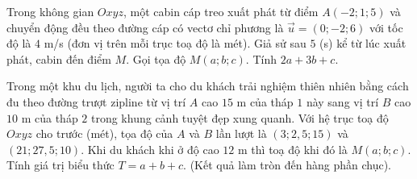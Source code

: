 \begin{bt}%
	Trong không gian $Oxyz$, một cabin cáp treo xuất phát từ điểm $A(-2;1;5)$ và chuyển động đều theo đường cáp có vectơ chỉ phương là $\overrightarrow{u}=(0;-2;6)$ với tốc độ là $4$ m/s (đơn vị trên mỗi trục toạ độ là mét). Giả sử sau $5$ (s) kể từ lúc xuất phát, cabin đến  điểm $M$. Gọi tọa độ $M(a;b;c)$. Tính $2a+3b+c$.
\end{bt}

\begin{bt}%
	Trong một khu du lịch, người ta cho du khách trải nghiệm thiên nhiên bằng cách đu theo đường trượt zipline từ vị trí $A$ cao $15$ m của tháp $1$ này sang vị trí $B$ cao $10$ m của tháp $2$ trong khung cảnh tuyệt đẹp xung quanh. Với  hệ trục toạ độ $Oxyz$ cho trước (mét), tọa độ của $A$ và $B$ lần lượt là $(3;2{,}5;15)$ và $(21;27{,}5;10)$. Khi du khách khi ở độ cao $12$ m thì toạ độ khi đó là $M(a;b;c)$. Tính giá trị biểu thức $T=a+b+c$. (Kết quả làm tròn đến hàng phần chục).
\end{bt}

